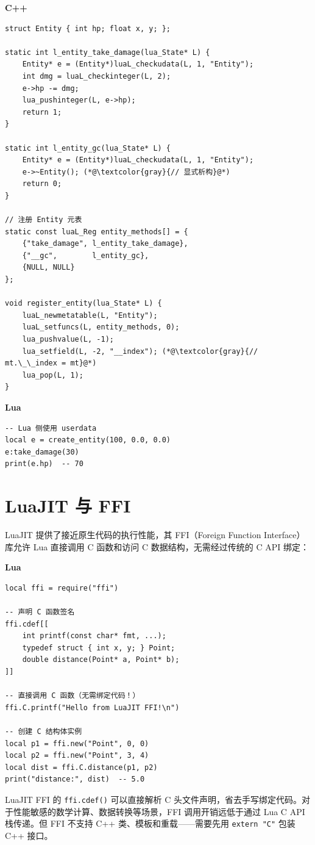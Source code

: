 \documentclass[12pt,a4paper,fontset=fandol]{ctexbook}
\newenvironment{bestpractice}[1][]{%
  \begin{tcolorbox}[enhanced,breakable,
    colback=purple!5!white,colframe=purple!60!black,
    boxed title style={colback=purple!60!black},
    attach boxed title to top left={yshift=-2mm,xshift=2mm},
    arc=2mm,boxrule=0.8mm,
    title={最佳实践},#1]}%
  {\end{tcolorbox}}
\newcommand{\Fn}[1]{\texttt{#1()}}
\newcommand{\cpplabel}{%
  \noindent\begin{tcolorbox}[colback=algheadbg,coltext=white,
    sharp corners,boxrule=0pt,width=3.0em,height=1.4em,
    halign=center,valign=center,nobeforeafter,left=0pt,right=0pt,
    top=0pt,bottom=0pt]\small\bfseries C++\end{tcolorbox}}
\newcommand{\lualabel}{%
  \noindent\begin{tcolorbox}[colback=luaheadbg,coltext=white,
    sharp corners,boxrule=0pt,width=3.0em,height=1.4em,
    halign=center,valign=center,nobeforeafter,left=0pt,right=0pt,
    top=0pt,bottom=0pt]\small\bfseries Lua\end{tcolorbox}}
\begin{document}
\cpplabel
\begin{lstlisting}[style=cppstyle]
struct Entity { int hp; float x, y; };

static int l_entity_take_damage(lua_State* L) {
    Entity* e = (Entity*)luaL_checkudata(L, 1, "Entity");
    int dmg = luaL_checkinteger(L, 2);
    e->hp -= dmg;
    lua_pushinteger(L, e->hp);
    return 1;
}

static int l_entity_gc(lua_State* L) {
    Entity* e = (Entity*)luaL_checkudata(L, 1, "Entity");
    e->~Entity(); (*@\textcolor{gray}{// 显式析构}@*)
    return 0;
}

// 注册 Entity 元表
static const luaL_Reg entity_methods[] = {
    {"take_damage", l_entity_take_damage},
    {"__gc",        l_entity_gc},
    {NULL, NULL}
};

void register_entity(lua_State* L) {
    luaL_newmetatable(L, "Entity");
    luaL_setfuncs(L, entity_methods, 0);
    lua_pushvalue(L, -1);
    lua_setfield(L, -2, "__index"); (*@\textcolor{gray}{// mt.\_\_index = mt}@*)
    lua_pop(L, 1);
}
\end{lstlisting}

\lualabel
\begin{lstlisting}[style=luastyle]
-- Lua 侧使用 userdata
local e = create_entity(100, 0.0, 0.0)
e:take_damage(30)
print(e.hp)  -- 70
\end{lstlisting}

\section{LuaJIT 与 FFI}\label{sec:luajit}

LuaJIT 提供了接近原生代码的执行性能，其 FFI（Foreign Function Interface）库允许 Lua 直接调用 C 函数和访问 C 数据结构，无需经过传统的 C API 绑定：

\lualabel
\begin{lstlisting}[style=luastyle]
local ffi = require("ffi")

-- 声明 C 函数签名
ffi.cdef[[
    int printf(const char* fmt, ...);
    typedef struct { int x, y; } Point;
    double distance(Point* a, Point* b);
]]

-- 直接调用 C 函数（无需绑定代码！）
ffi.C.printf("Hello from LuaJIT FFI!\n")

-- 创建 C 结构体实例
local p1 = ffi.new("Point", 0, 0)
local p2 = ffi.new("Point", 3, 4)
local dist = ffi.C.distance(p1, p2)
print("distance:", dist)  -- 5.0
\end{lstlisting}

\begin{bestpractice}[title={LuaJIT FFI 使用建议}]
LuaJIT FFI 的 \Fn{ffi.cdef} 可以直接解析 C 头文件声明，省去手写绑定代码。对于性能敏感的数学计算、数据转换等场景，FFI 调用开销远低于通过 Lua C API 栈传递。但 FFI 不支持 C++ 类、模板和重载——需要先用 \texttt{extern "C"} 包装 C++ 接口。
\end{bestpractice}
\end{document}

